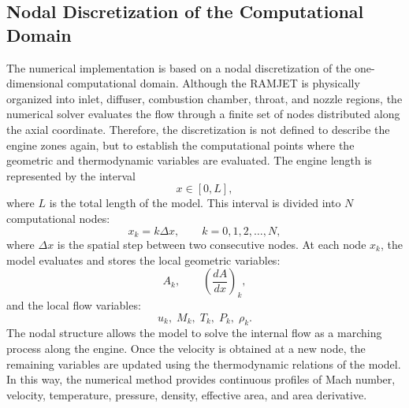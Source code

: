 \documentclass[preprint,12pt]{elsarticle}
\begin{document}
\subsection{Nodal Discretization of the Computational Domain}
The numerical implementation is based on a nodal discretization of the one-dimensional computational domain. Although the RAMJET is physically organized into inlet, diffuser, combustion chamber, throat, and nozzle regions, the numerical solver evaluates the flow through a finite set of nodes distributed along the axial coordinate. Therefore, the discretization is not defined to describe the engine zones again, but to establish the computational points where the geometric and thermodynamic variables are evaluated.
The engine length is represented by the interval
\begin{equation}
x\in[0,L],
\end{equation}
where $L$ is the total length of the model. This interval is divided into $N$ computational nodes:
\begin{equation}
x_k = k\Delta x,
\qquad
k=0,1,2,\ldots,N,
\label{eq:nodal_grid}
\end{equation}
where $\Delta x$ is the spatial step between two consecutive nodes.
At each node $x_k$, the model evaluates and stores the local geometric variables:
\begin{equation}
A_k,
\qquad
\left(\frac{dA}{dx}\right)_k,
\end{equation}
and the local flow variables:
\begin{equation}
u_k,\;
M_k,\;
T_k,\;
P_k,\;
\rho_k.
\label{eq:nodal_variables}
\end{equation}
The nodal structure allows the model to solve the internal flow as a marching process along the engine. Once the velocity is obtained at a new node, the remaining variables are updated using the thermodynamic relations of the model. In this way, the numerical method provides continuous profiles of Mach number, velocity, temperature, pressure, density, effective area, and area derivative.
\end{document}

